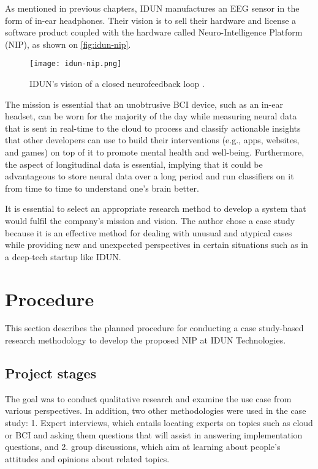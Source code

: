 As mentioned in previous chapters, IDUN manufactures an EEG sensor in the form of in-ear headphones. Their vision is to sell their hardware and license a software product coupled with the hardware called Neuro-Intelligence Platform (NIP), as shown on \autoref{fig:idun-nip}.

\begin{figure}[!ht]
  \centering
  \texttt{[image: idun-nip.png]}
  \caption{IDUN's vision of a closed neurofeedback loop \citep{idun_guardian_nodate}.}
  \label{fig:idun-nip}
\end{figure}

The mission is essential that an unobtrusive BCI device, such as an in-ear headset, can be worn for the majority of the day while measuring neural data that is sent in real-time to the cloud to process and classify actionable insights that other developers can use to build their interventions (e.g., apps, websites, and games) on top of it to promote mental health and well-being. Furthermore, the aspect of longitudinal data is essential, implying that it could be advantageous to store neural data over a long period and run classifiers on it from time to time to understand one's brain better.

It is essential to select an appropriate research method to develop a system that would fulfil the company's mission and vision. The author chose a case study because it is an effective method for dealing with unusual and atypical cases while providing new and unexpected perspectives in certain situations such as in a deep-tech startup like IDUN.

\section{Procedure}
\label{chapter3-procedure}

This section describes the planned procedure for conducting a case study-based research methodology to develop the proposed NIP at IDUN Technologies.

\subsection{Project stages}
\label{chapter3-project-stages}

The goal was to conduct qualitative research and examine the use case from various perspectives. In addition, two other methodologies were used in the case study: 1. Expert interviews, which entails locating experts on topics such as cloud or BCI and asking them questions that will assist in answering implementation questions, and 2. group discussions, which aim at learning about people's attitudes and opinions about related topics.

